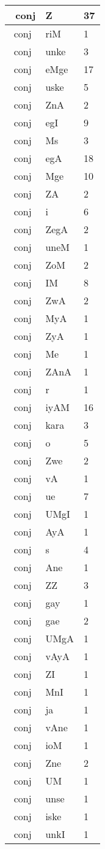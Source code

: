 \documentclass[a4 paper]{article}
\begin{document}
\begin{longtable}{cp{}p{}}
\ \midrule conj & Z & 37\\ \midrule conj & riM & 1\\ \midrule conj & unke & 3\\ \midrule conj & eMge & 17\\ \midrule conj & uske & 5\\ \midrule conj & ZnA & 2\\ \midrule conj & egI & 9\\ \midrule conj & Ms & 3\\ \midrule conj & egA & 18\\ \midrule conj & Mge & 10\\ \midrule conj & ZA & 2\\ \midrule conj & i & 6\\ \midrule conj & ZegA & 2\\ \midrule conj & uneM & 1\\ \midrule conj & ZoM & 2\\ \midrule conj & IM & 8\\ \midrule conj & ZwA & 2\\ \midrule conj & MyA & 1\\ \midrule conj & ZyA & 1\\ \midrule conj & Me & 1\\ \midrule conj & ZAnA & 1\\ \midrule conj & r & 1\\ \midrule conj & iyAM & 16\\ \midrule conj & kara & 3\\ \midrule conj & o & 5\\ \midrule conj & Zwe & 2\\ \midrule conj & vA & 1\\ \midrule conj & ue & 7\\ \midrule conj & UMgI & 1\\ \midrule conj & AyA & 1\\ \midrule conj & s & 4\\ \midrule conj & Ane & 1\\ \midrule conj & ZZ & 3\\ \midrule conj & gay & 1\\ \midrule conj & gae & 2\\ \midrule conj & UMgA & 1\\ \midrule conj & vAyA & 1\\ \midrule conj & ZI & 1\\ \midrule conj & MnI & 1\\ \midrule conj & ja & 1\\ \midrule conj & vAne & 1\\ \midrule conj & ioM & 1\\ \midrule conj & Zne & 2\\ \midrule conj & UM & 1\\ \midrule conj & unse & 1\\ \midrule conj & iske & 1\\ \midrule conj & unkI & 1\\ \midrule 

\end{longtable}
\end{document}
